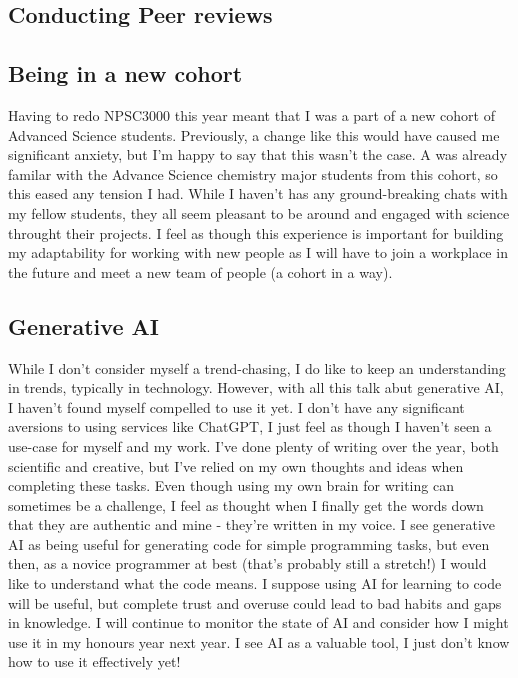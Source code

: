 \documentclass[11pt]{article}
\begin{document}
\subsection{Conducting Peer reviews}
\subsection{Being in a new cohort}

Having to redo NPSC3000 this year meant that I was a part of a new cohort of Advanced Science students. Previously, a change like this would have caused me significant anxiety, but I'm happy to say that this wasn't the case. A was already familar with the Advance Science chemistry major students from this cohort, so this eased any tension I had. While I haven't has any ground-breaking chats with my fellow students, they all seem pleasant to be around and engaged with science throught their projects. I feel as though this experience is important for building my adaptability for working with new people as I will have to join a workplace in the future and meet a new team of people (a cohort in a way).

\subsection{Generative AI}

While I don't consider myself a trend-chasing, I do like to keep an understanding in trends, typically in technology. However, with all this talk abut generative AI, I haven't found myself compelled to use it yet. I don't have any significant aversions to using services like ChatGPT, I just feel as though I haven't seen a use-case for myself and my work. I've done plenty of writing over the year, both scientific and creative, but I've relied on my own thoughts and ideas when completing these tasks. Even though using my own brain for writing can sometimes be a challenge, I feel as thought when I finally get the words down that they are authentic and mine - they're written in my voice. I see generative AI as being useful for generating code for simple programming tasks, but even then, as a novice programmer at best (that's probably still a stretch!) I would like to understand what the code means. I suppose using AI for learning to code will be useful, but complete trust and overuse could lead to bad habits and gaps in knowledge. I will continue to monitor the state of AI and consider how I might use it in my honours year next year. I see AI as a valuable tool, I just don't know how to use it effectively yet!
\end{document}
